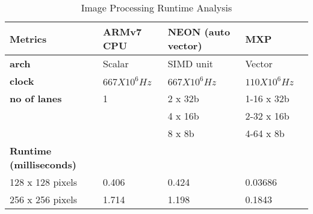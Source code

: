 \begin{table}[htbp]
	\centering
		\begin{adjustbox}{width=.9\textwidth}
		\small
	\begin{tabular}{lllll}
		\toprule
		\textbf{Metrics} & \textbf{ARMv7 CPU} & \textbf{NEON (auto vector)} & \textbf{MXP} \\
		\midrule
		\textbf{arch} & Scalar & SIMD unit & Vector \\
		\textbf{clock} & $667 X 10^{6}Hz$ & $667 X 10^{6}Hz$ & $110 X 10^{6}Hz$ \\
		\textbf{no of lanes} & 1 & 2 x 32b & 1-16 x 32b \\
		&   & 4 x 16b & 2-32 x 16b \\
		&   & 8 x 8b & 4-64 x 8b \\
		\midrule
	\textbf{Runtime (milliseconds)} &   &   &  \\
		\midrule
     128 x  128      pixels & 0.406 & 0.424 & 0.03686  \\	
	 256 x  256      pixels & 1.714 & 1.198 & 0.1843  \\
		\bottomrule
	\end{tabular}%
     \end{adjustbox}%
	\caption{Image Processing Runtime Analysis}
		\label{ga:100}%
\end{table}%